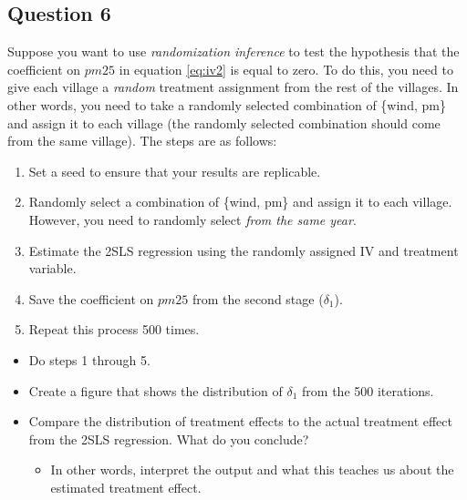 \documentclass[
]{article}
\providecommand{\tightlist}{%
  \setlength{\itemsep}{0pt}\setlength{\parskip}{0pt}}
\begin{document}
\subsection{Question 6}\label{question-6}

Suppose you want to use \emph{randomization inference} to test the hypothesis that the coefficient on \(pm25\) in equation \eqref{eq:iv2} is equal to zero. To do this, you need to give each village a \emph{random} treatment assignment from the rest of the villages. In other words, you need to take a randomly selected combination of \{wind, pm\} and assign it to each village (the randomly selected combination should come from the same village). The steps are as follows:

\begin{enumerate}
\def\labelenumi{\arabic{enumi}.}
\tightlist
\item
  Set a seed to ensure that your results are replicable.
\item
  Randomly select a combination of \{wind, pm\} and assign it to each village. However, you need to randomly select \emph{from the same year}.
\item
  Estimate the 2SLS regression using the randomly assigned IV and treatment variable.
\item
  Save the coefficient on \(pm25\) from the second stage (\(\delta_1\)).
\item
  Repeat this process 500 times.
\end{enumerate}

\begin{itemize}
\tightlist
\item
  Do steps 1 through 5.
\item
  Create a figure that shows the distribution of \(\delta_1\) from the 500 iterations.
\item
  Compare the distribution of treatment effects to the actual treatment effect from the 2SLS regression. What do you conclude?

  \begin{itemize}
  \tightlist
  \item
    In other words, interpret the output and what this teaches us about the estimated treatment effect.
  \end{itemize}
\end{itemize}
\end{document}
